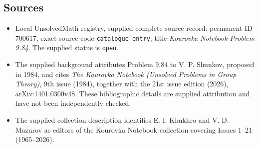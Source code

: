 \documentclass[11pt]{article}
\begin{document}
\subsection{Sources}
\begin{itemize}
\item Local UnsolvedMath registry, supplied complete source record: permanent ID \(700617\), exact source code \texttt{catalogue entry}, title \emph{Kourovka Notebook Problem 9.84}. The supplied status is \texttt{open}.
\item The supplied background attributes Problem 9.84 to V. P. Shunkov, proposed in 1984, and cites \emph{The Kourovka Notebook (Unsolved Problems in Group Theory)}, 9th issue (1984), together with the 21st issue edition (2026), arXiv:1401.0300v48. These bibliographic details are supplied attribution and have not been independently checked.
\item The supplied collection description identifies E. I. Khukhro and V. D. Mazurov as editors of the Kourovka Notebook collection covering Issues 1--21 (1965--2026).
\end{itemize}
\end{document}
